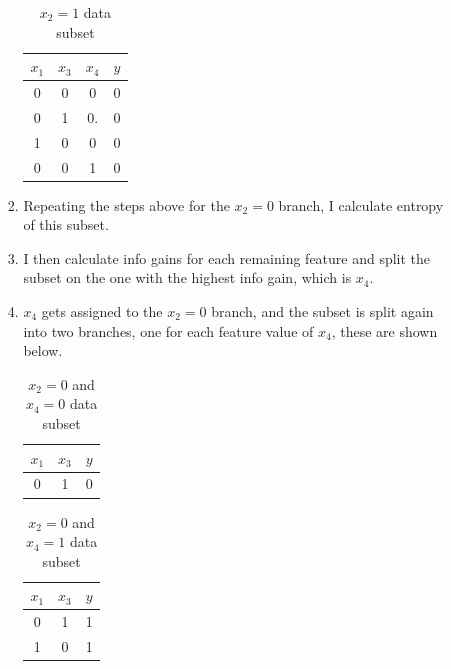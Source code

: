 \documentclass[12pt, fullpage,letterpaper]{article}
\begin{document}
\begin{enumerate}
\begin{enumerate}
\begin{enumerate}
		\begin{table}[h]
			\centering
			\begin{tabular}{ccc|c}
				$x_1$ & $x_3$ & $x_4$ & $y$\\ 
				\hline\hline

				0  & 0 & 0 & 0 \\ \hline
				0  & 1 & 0.& 0\\ \hline
				1  & 0 & 0 & 0\\ \hline
				0  & 0 & 1 & 0\\ \hline
	
			\end{tabular}
			\caption{$x_2=1$ data subset}
		
		\end{table}
		
		\item Repeating the steps above for the $x_2 = 0$ branch, I calculate entropy of this subset.
		\item I then calculate info gains for each remaining feature and split the subset on the one with the highest info gain, which is $x_4$.
		\item $x_4$ gets assigned to the $x_2 = 0$ branch, and the subset is split again into two branches, one for each feature value of $x_4$, these are shown below. 
		
		\begin{table}[h]
			\centering
			\begin{tabular}{cc|c}
				$x_1$ & $x_3$  & $y$\\ 
				\hline\hline

				0 & 1 & 0  \\ \hline

	
			\end{tabular}
			\caption{$x_2=0$ and $x_4=0$ data subset}
		
		\end{table}
		
		\begin{table}[h]
			\centering
			\begin{tabular}{cc|c}
				$x_1$ & $x_3$  & $y$\\ 
				\hline\hline
				
				0 & 1  & 1 \\ \hline
				1 & 0  & 1 \\ \hline
	
			\end{tabular}
			\caption{$x_2=0$ and $x_4=1$ data subset}
		
		\end{table}
		

\end{enumerate}
\end{enumerate}
\end{enumerate}
\end{document}
